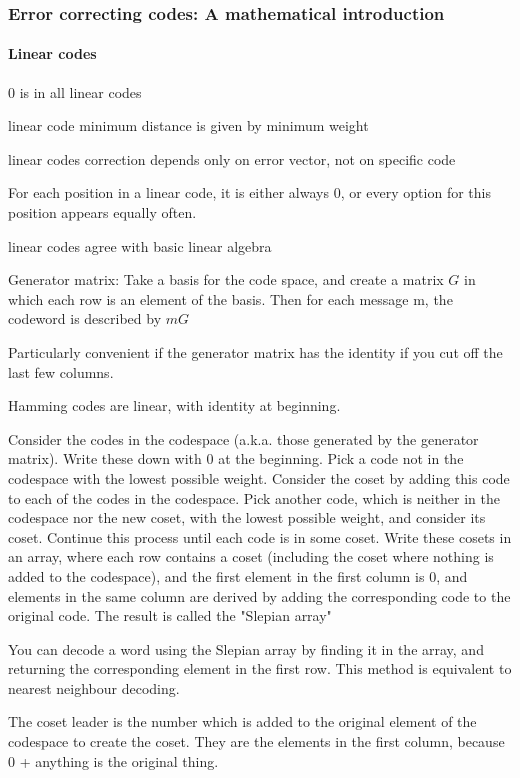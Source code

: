 \documentclass{article}
\begin{document}
\subsubsection{Error correcting codes: A  mathematical introduction}

\paragraph{Linear codes}

0 is in all linear codes

linear code minimum distance is given by minimum weight

linear codes correction depends only on error vector, not on  specific code

For each position in a linear code, it is either always 0, or every option for this position appears equally often.

linear codes agree with basic linear algebra

Generator matrix: Take a basis for the code space, and create a matrix $G$ in which each row is an element of the basis. Then for each message m, the codeword is described by $m G$

Particularly convenient if the generator matrix has the identity if you cut off the last few columns.

Hamming codes are linear, with identity at beginning.

Consider the codes in the codespace (a.k.a. those generated by the generator matrix). Write these down with 0 at the beginning. Pick a code not in the codespace with the lowest possible weight. Consider the coset by adding this code to each of the codes in the codespace. Pick another code, which is neither in the codespace nor the new coset, with the lowest possible weight, and consider its coset. Continue this process until each code is in some coset. Write these cosets in an array, where each row contains a coset (including the coset where nothing is added to the codespace), and the first element in the first column is 0, and elements in the same column are derived by adding the corresponding code to the original code. The result is called the "Slepian array"

You can decode a word using the Slepian array by finding it in the array, and returning the corresponding element in the first row. This method is equivalent to nearest neighbour decoding.

The coset leader is the number which is added to the original element of the codespace to create the coset. They are the elements in the first column, because 0 + anything is the original thing.
\end{document}
